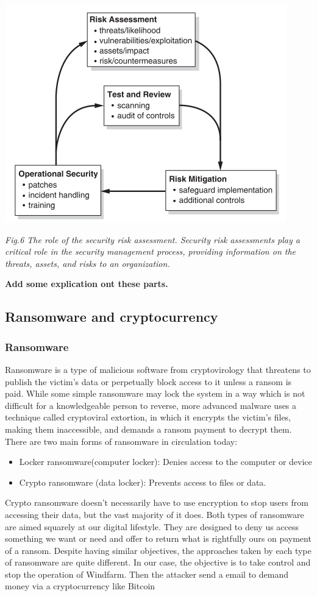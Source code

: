 \documentclass[twosided,a4,10pt]{article}
\begin{document}
\begin{multicols}{2}
\includegraphics[scale=0.65]{security_management}
\begin{center}
	\textit{Fig.6 The role of the security risk assessment. Security risk assessments play a critical role in the security management process, providing information on the threats, assets, and risks to an organization.}
\end{center}

\textbf{Add some explication ont these parts.} 
 
 
\subsection{Ransomware and cryptocurrency}
\subsubsection{Ransomware}
Ransomware is a type of malicious software from cryptovirology that threatens to publish the victim's data or perpetually block access to it unless a ransom is paid. While some simple ransomware may lock the system in a way which is not difficult for a knowledgeable person to reverse, more advanced malware uses a technique called cryptoviral extortion, in which it encrypts the victim's files, making them inaccessible, and demands a ransom payment to decrypt them.\newline
There are two main forms of ransomware in circulation today:
\begin{itemize}
    \item Locker ransomware(computer locker):
Denies access to the
computer or device
\item Crypto ransomware
(data locker): Prevents
access to files or data.
\end{itemize}
Crypto ransomware doesn’t necessarily have to use encryption to stop users from accessing their data, but the vast majority of it does. Both types of ransomware are aimed squarely at our digital lifestyle. They are designed to deny us access something we want or need and offer to return what is rightfully ours on payment of a ransom. Despite having similar objectives, the approaches taken by each type of ransomware are quite different.
In our case, the objective is to take control and stop the operation of Windfarm. Then the attacker send a email to demand money via a cryptocurrency like Bitcoin



\end{multicols}
\end{document}
